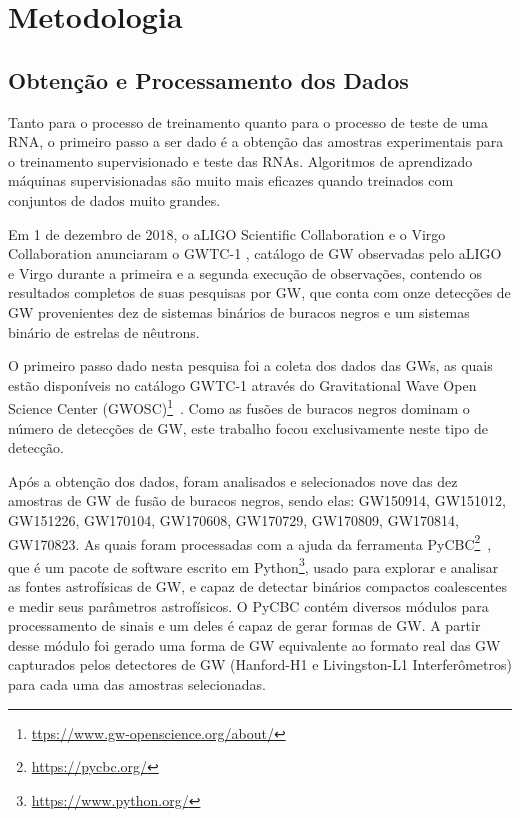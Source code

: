 \chapter{Metodologia}
\label{chap:metodologia}

\section{Obtenção e Processamento dos Dados}
\label{sec:obtencao-processamento-dados}

Tanto para o processo de treinamento quanto para o processo de teste de uma RNA, o primeiro passo a ser dado é a obtenção das amostras experimentais para o treinamento supervisionado e teste das RNAs. Algoritmos de aprendizado máquinas supervisionadas são muito mais eficazes quando treinados com conjuntos de dados muito grandes.

Em 1 de dezembro de 2018, o aLIGO Scientific Collaboration e o Virgo Collaboration anunciaram o GWTC-1 \cite{Abbott_2019}, catálogo de GW observadas pelo aLIGO e Virgo durante a primeira e a segunda execução de observações, contendo os resultados completos de suas pesquisas por GW, que conta com onze detecções de GW provenientes dez de sistemas binários de buracos negros e um sistemas binário de estrelas de nêutrons.

O primeiro passo dado nesta pesquisa foi a coleta dos dados das GWs, as quais estão disponíveis no catálogo GWTC-1 através do Gravitational Wave Open Science Center (GWOSC)\footnote{\href{https://www.gw-openscience.org/about/}{ttps://www.gw-openscience.org/about/}}~\cite{vallisneri2015ligo}. Como as fusões de buracos negros dominam o número de detecções de GW, este trabalho focou exclusivamente neste tipo de detecção.

Após a obtenção dos dados, foram analisados e selecionados nove das dez amostras de GW de fusão de buracos negros, sendo elas: GW150914, GW151012, GW151226, GW170104, GW170608, GW170729, GW170809, GW170814, GW170823. As quais foram processadas com a ajuda da ferramenta PyCBC\footnote{\href{https://pycbc.org/}{https://pycbc.org/}}~\cite{alex_nitz_2019_2801307}, que é um pacote de software escrito em Python\footnote{\href{https://www.python.org/}{https://www.python.org/}}, usado para explorar e analisar as fontes astrofísicas de GW, e capaz de detectar binários compactos coalescentes e medir seus parâmetros astrofísicos. O PyCBC contém diversos módulos para processamento de sinais e um deles é capaz de gerar formas de GW. A partir desse módulo foi gerado uma forma de GW equivalente ao formato real das GW capturados pelos detectores de GW (Hanford-H1 e Livingston-L1 Interferômetros) para cada uma das amostras selecionadas.

